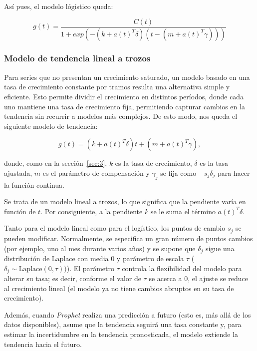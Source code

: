 \documentclass[12pt,twoside]{article}
\begin{document}
Así pues, el modelo lógistico queda: 

\begin{equation}
g(t) = \frac{C(t)}{1 + exp(-(k+a(t)^T \delta)(t-(m+a(t)^T \gamma)))}
\end{equation}

\subsubsection{Modelo de tendencia lineal a trozos}\label{sec:4}

Para series que no presentan un crecimiento saturado, un modelo basado en una tasa de crecimiento constante por tramos resulta una alternativa simple y eficiente. Esto permite dividir el crecimiento en distintos períodos, donde cada uno mantiene una tasa de crecimiento fija, permitiendo capturar cambios en la tendencia sin recurrir a modelos más complejos. De esto modo, nos queda el siguiente modelo de tendencia: 

\begin{equation}
g(t) = (k + a(t)^T \delta)t + (m + a(t)^T \gamma),
\end{equation}

donde, como en la sección~\ref{sec:3}, $k$ es la tasa de crecimiento, $\delta$ es la tasa ajustada, $m$ es el parámetro de compensación y $\gamma_j$ se fija como $-s_j \delta_j$ para hacer la función continua.

Se trata de un modelo lineal a trozos, lo que significa que la pendiente varía en función de $t$. Por consiguiente, a la pendiente $k$ se le suma el término  $a(t)^T \delta$.

Tanto para el modelo lineal como para el logístico, los puntos de cambio $s_j$ se pueden modificar. Normalmente, se especifica un gran número de puntos cambios (por ejemplo, uno al mes durante varios años) y se supone que $\delta_j$ sigue una distribución de Laplace con media $0$ y parámetro de escala $\tau$ ($\delta_j \sim \text{Laplace}(0, \tau))$). El parámetro $\tau$ controla la flexibilidad del modelo para alterar su tasa; es decir, conforme el valor de $\tau$ se acerca a $0$, el ajuste se reduce al crecimiento lineal (el modelo ya no tiene cambios abruptos en su tasa de crecimiento).

Además, cuando \textit{Prophet} realiza una predicción a futuro (esto es, más allá de los datos disponibles), asume que la tendencia seguirá una tasa constante y, para estimar la incertidumbre en la tendencia pronosticada, el modelo extiende la tendencia hacia el futuro. 
\end{document}
